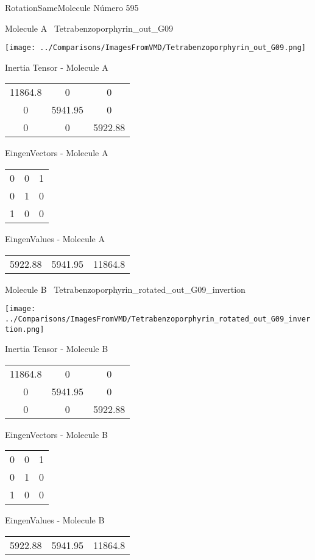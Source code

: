 \vtab[-3cm]
\begin{center}
{\large RotationSameMolecule \tab Número 595}
\end{center}
\begin{multicols}{2}
\begin{center}

Molecule A \
Tetrabenzoporphyrin\_out\_G09

\texttt{[image: ../Comparisons/ImagesFromVMD/Tetrabenzoporphyrin\_out\_G09.png]}

Inertia Tensor - Molecule A \\
\begin{tabular}{|c c c|}
11864.8	 & 	0	 & 	0	 \\
0	 & 	5941.95	 & 	0	 \\
0	 & 	0	 & 	5922.88
\end{tabular}

\vtab
 EingenVectors - Molecule A     \\
\begin{tabular}{|c c c|}
0	 & 	0	 & 	1	 \\
0	 & 	1	 & 	0	 \\
1	 & 	0	 & 	0
\end{tabular}

\vtab
 EingenValues - Molecule A     \\
\begin{tabular}{|c c c|}
5922.88	 & 	5941.95	 & 	11864.8	 \\
\end{tabular}
\columnbreak

Molecule B \
Tetrabenzoporphyrin\_rotated\_out\_G09\_invertion

\texttt{[image: ../Comparisons/ImagesFromVMD/Tetrabenzoporphyrin\_rotated\_out\_G09\_invertion.png]}

Inertia Tensor - Molecule B \\
\begin{tabular}{|c c c|}
11864.8	 & 	0	 & 	0	 \\
0	 & 	5941.95	 & 	0	 \\
0	 & 	0	 & 	5922.88
\end{tabular}

\vtab
 EingenVectors - Molecule B     \\
\begin{tabular}{|c c c|}
0	 & 	0	 & 	1	 \\
0	 & 	1	 & 	0	 \\
1	 & 	0	 & 	0
\end{tabular}

\vtab
 EingenValues - Molecule B     \\
\begin{tabular}{|c c c|}
5922.88	 & 	5941.95	 & 	11864.8	 \\
\end{tabular}

\end{center}
\end{multicols}


